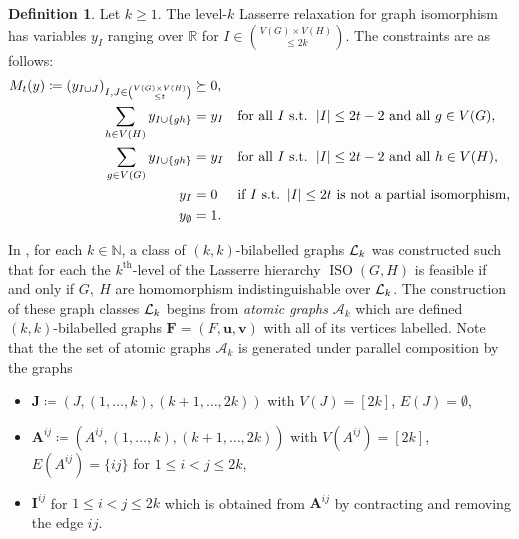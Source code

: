 \documentclass[11pt,a4paper]{article}
\theoremstyle{plain}
\theoremstyle{remark}
\theoremstyle{definition}
\newtheorem{definition}[thm]{Definition}
\DeclareMathOperator{\iso}{ISO}
\newcommand{\card}[1]{\left\lvert #1 \right\rvert}
\def\calA{{\mathcal A}} \def\calB{{\mathcal B}} \def\calC{{\mathcal C}}
\begin{document}
\begin{definition}
    Let $k \geq 1$. The level-$k$ Lasserre relaxation for graph isomorphism has variables $y_I$ ranging over $\mathbb{R}$ for $I \in \binom{V(G)\times V(H)} {\leq 2k} $. The constraints are as follows: 
    \begin{align}
        \begin{aligned}
            M_t(y) \coloneqq (y_{I \cup J})_{I, J \in \binom{V(G) \times V(H)}{\leq t}}  &\succeq 0,&& \\
			\sum_{h \in V(H)} y_{I \cup \{gh\}} &= y_{I} &&\text{for all } I \text{ s.t. } \card{I} \leq 2t-2 \text{ and all } g \in V(G), \\
			\sum_{g \in V(G)} y_{I \cup \{gh\}} &= y_{I} && \text{for all } I \text{ s.t. } \card{I} \leq 2t-2 \text{ and all } h \in V(H),  \\
			y_I & = 0 && \text{if } I \text{ s.t.\@ } \card{I} \leq 2t \text{ is not a partial isomorphism,}\\
			y_{\emptyset}& = 1. && \label{lassere5}
        \end{aligned}
    \end{align}
\end{definition}

In \cite{roberson-seppelt-arxiv}, for each $k \in \mathbb{N}$, a class of $(k,k)$-bilabelled graphs ${\mathcal L}_k$ was constructed such that for each the $k^{\text{th}}$-level of the Lasserre hierarchy $\iso(G,H)$ is feasible if and only if $G,\ H$ are homomorphism indistinguishable over ${\mathcal L}_k$. The construction of these graph classes ${\mathcal L}_k$ begins from \emph{atomic graphs} $\calA_k$ which are defined $(k,k)$-bilabelled graphs $\boldsymbol{F} = (F, \boldsymbol{u}, \boldsymbol{v})$ with all of its vertices labelled. Note that the the set of atomic graphs $\mathcal{A}_k$ is generated under parallel composition by the graphs
		\begin{itemize}
			\item $\boldsymbol{J} \coloneqq (J, (1,\dots, k), (k+1, \dots, 2k))$ with $V(J) = [2k]$, $E(J) = \emptyset$,
			\item $\boldsymbol{A}^{ij} \coloneqq (A^{ij}, (1,\dots, k), (k+1, \dots, 2k))$ with $V(A^{ij}) = [2k]$, $E(A^{ij}) = \{ij\}$ for $1 \leq i < j \leq 2k$,
			\item $\boldsymbol{I}^{ij}$ for $1 \leq i < j \leq 2k$ which is obtained from $\boldsymbol{A}^{ij}$ by contracting and removing the edge $ij$. 
		\end{itemize}
\end{document}
